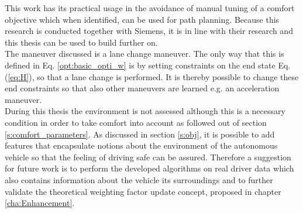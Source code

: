 This work has its practical usage in the avoidance of manual tuning of a comfort objective which when identified, can be used for path planning. Because this research is conducted together with Siemens, it is in line with their research and this thesis can be used to build further on.\\
The maneuver discussed is a lane change maneuver. The only way that this is defined in Eq. \ref{opt:basic_opti_w} is by setting constraints on the end state Eq. (\ref{eq:H}), so that a lane change is performed. It is thereby possible to change these end constraints so that also other maneuvers are learned e.g. an acceleration maneuver.\\
During this thesis the environment is not assessed although this is a necessary condition in order to take comfort into account as followed out of section \ref{s:comfort_parameters}. As discussed in section \ref{s:obj}, it is possible to add features that encapsulate notions about the environment of the autonomous vehicle so that the feeling of driving safe can be assured. Therefore a suggestion for future work is to perform the developed algorithms on real driver data which also contains information about the vehicle its surroundings and to further validate the theoretical weighting factor update concept, proposed in chapter \ref{cha:Enhancement}.

%



